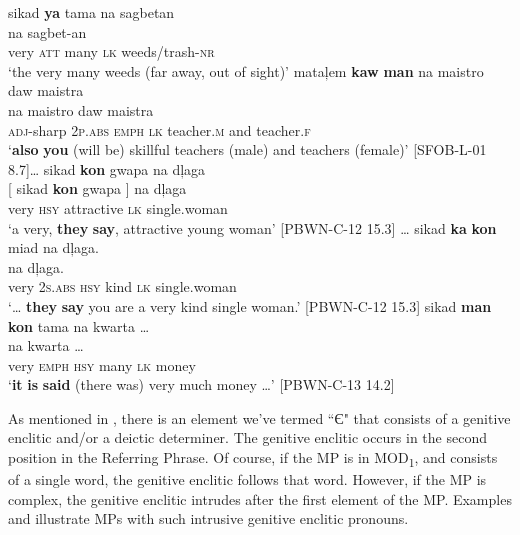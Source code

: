 \ea
\label{bkm:Ref424739555}\label{bkm:Ref401111978}
sikad  \textbf{ya}  tama  na  sagbetan \\\smallskip
   na  sagbet-an \\
  {} very  \textsc{att}  many {} \textsc{lk}  weeds/trash-\textsc{nr} \\
\glt ‘the very many weeds (far away, out of sight)’
\z
\ea
\label{bkm:Ref424739557}
mataļem  \textbf{kaw}  \textbf{man}  na  maistro  daw  maistra \\\smallskip
   na  maistro  daw  maistra \\
{} \textsc{adj}-sharp  2\textsc{p.abs}  \textsc{emph} {} \textsc{lk}  teacher.\textsc{m}  and  teacher.\textsc{f} \\
\glt ‘\textbf{also} \textbf{you} (will be) skillful teachers (male) and teachers (female)’ [SFOB-L-01 8.7]…
\z
\ea
sikad  \textbf{kon}  gwapa  na  dļaga \\\smallskip
 \gll {}[ sikad  \textbf{kon}  gwapa ]  na  dļaga \\
 {} very  \textsc{hsy}  attractive {} \textsc{lk}  single.woman \\
\glt ‘a very, \textbf{they} \textbf{say}, attractive young woman’ [PBWN-C-12 15.3]
\z
\ea
… sikad  \textbf{ka}  \textbf{kon}  miad  na  dļaga. \\\smallskip
   na  dļaga. \\
  {} {}  very  2\textsc{s.abs  hsy}  kind {} \textsc{lk}  single.woman \\
\glt ‘… \textbf{they} \textbf{say} you  are a very kind single woman.’ [PBWN-C-12 15.3]
\z
\ea
\label{bkm:Ref422823012}
sikad  \textbf{man}  \textbf{kon}  tama   na  kwarta … \\\smallskip
   na  kwarta … \\
{}  very  \textsc{emph}  \textsc{hsy}  many  {}  \textsc{lk}  money \\
\glt  ‘\textbf{it} \textbf{is} \textbf{said} (there was) very much money …' [PBWN-C-13 14.2]
\z

As mentioned in ,  there is an element we’ve termed “{Є}" that consists of a genitive enclitic and/or a deictic determiner. The genitive enclitic occurs in the second position in the Referring Phrase. Of course, if the MP is in MOD\textsubscript{1}, and consists of a single word, the genitive enclitic follows that word. However, if the MP is complex, the genitive enclitic intrudes after the first element of the MP. Examples  and  illustrate MPs with such intrusive genitive enclitic pronouns.

